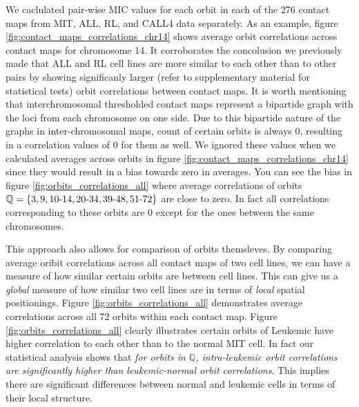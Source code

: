 \documentclass[a4,center,fleqn]{NAR}
\begin{document}
We caclulated pair-wise MIC values 
for each orbit in each of the 276
contact maps from MIT, ALL, RL, and CALL4 data separately. 
As an example,
figure \ref{fig:contact_maps_correlations_chr14}
shows average orbit correlations across contact maps
for chromosome 14.
It corroborates the
concolusion we previously made that ALL and RL cell lines 
are more similar to each other than to other pairs by showing
significanly larger (refer to supplementary material for statistical tests)
orbit correlations between contact maps.
It is worth mentioning that interchromosomal thresholded contact maps 
represent
a bipartide graph with the loci from each chromosome on one side. Due to this
bipartide nature of the graphs in inter-chromosomal maps,
count of certain orbits is always 0, resulting in
a correlation values of 0 for them as well.
We ignored these values  when we calculated averages across orbits 
in figure \ref{fig:contact_maps_correlations_chr14} since they
would result in a bias towards zero in averages. You can see the bias in 
figure \ref{fig:orbits_correlations_all} where average correlations of orbits
$\mathbb{Q} = \{3, 9, 10{\text -}14, 20{\text -}34, 39{\text -}48, 51{\text -}72\}$ 
are close to zero. In fact all correlations
corresponding to these orbits are 0 except for the ones between the same 
chromosomes.

This approach also allows for comparison of orbits
themsleves. By comparing average oribit correlations
across all contact maps of two cell lines, we can
have a measure of how similar certain orbits are
between cell lines. This can give us a 
\textit{global} measure
of how similar two cell lines are in terms of 
\textit{local} spatial positionings.
Figure \ref{fig:orbits_correlations_all} 
demonstrates average correlations across all 72 orbits within each contact map.
Figure \ref{fig:orbits_correlations_all} clearly illustrates certain
orbits of Leukemic have higher correlation to each other than to the
normal MIT cell. In fact our statistical analysis shows that 
\textit {for orbits in $\mathbb{Q}$, 
intra-leukemic orbit correlations are significantly higher
than leukemic-normal orbit correlations}. This implies
there are significant differences between normal and
leukemic cells in terms of their local structure.
\end{document}
